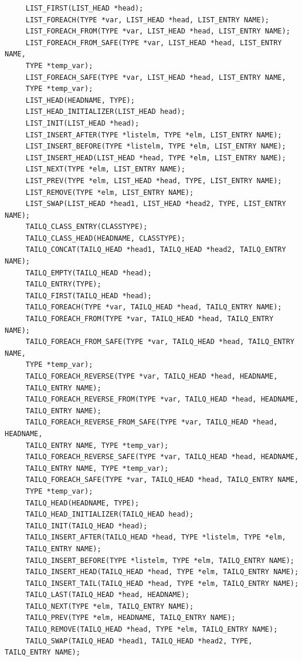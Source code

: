 \documentclass[journal,10pt,onecolumn,compsoc,letterpaper,draftclsnofoot,table,xcdraw]{IEEEtran} \usepackage[margin=0.75in]{geometry}
\begin{document}
\begin{verbatim}
     LIST_FIRST(LIST_HEAD *head);
     LIST_FOREACH(TYPE *var, LIST_HEAD *head, LIST_ENTRY NAME);
     LIST_FOREACH_FROM(TYPE *var, LIST_HEAD *head, LIST_ENTRY NAME);
     LIST_FOREACH_FROM_SAFE(TYPE *var, LIST_HEAD *head,	LIST_ENTRY NAME,
	 TYPE *temp_var);
     LIST_FOREACH_SAFE(TYPE *var, LIST_HEAD *head, LIST_ENTRY NAME,
	 TYPE *temp_var);
     LIST_HEAD(HEADNAME, TYPE);
     LIST_HEAD_INITIALIZER(LIST_HEAD head);
     LIST_INIT(LIST_HEAD *head);
     LIST_INSERT_AFTER(TYPE *listelm, TYPE *elm, LIST_ENTRY NAME);
     LIST_INSERT_BEFORE(TYPE *listelm, TYPE *elm, LIST_ENTRY NAME);
     LIST_INSERT_HEAD(LIST_HEAD	*head, TYPE *elm, LIST_ENTRY NAME);
     LIST_NEXT(TYPE *elm, LIST_ENTRY NAME);
     LIST_PREV(TYPE *elm, LIST_HEAD *head, TYPE, LIST_ENTRY NAME);
     LIST_REMOVE(TYPE *elm, LIST_ENTRY NAME);
     LIST_SWAP(LIST_HEAD *head1, LIST_HEAD *head2, TYPE, LIST_ENTRY NAME);
     TAILQ_CLASS_ENTRY(CLASSTYPE);
     TAILQ_CLASS_HEAD(HEADNAME,	CLASSTYPE);
     TAILQ_CONCAT(TAILQ_HEAD *head1, TAILQ_HEAD	*head2,	TAILQ_ENTRY NAME);
     TAILQ_EMPTY(TAILQ_HEAD *head);
     TAILQ_ENTRY(TYPE);
     TAILQ_FIRST(TAILQ_HEAD *head);
     TAILQ_FOREACH(TYPE	*var, TAILQ_HEAD *head,	TAILQ_ENTRY NAME);
     TAILQ_FOREACH_FROM(TYPE *var, TAILQ_HEAD *head, TAILQ_ENTRY NAME);
     TAILQ_FOREACH_FROM_SAFE(TYPE *var,	TAILQ_HEAD *head, TAILQ_ENTRY NAME,
	 TYPE *temp_var);
     TAILQ_FOREACH_REVERSE(TYPE	*var, TAILQ_HEAD *head,	HEADNAME,
	 TAILQ_ENTRY NAME);
     TAILQ_FOREACH_REVERSE_FROM(TYPE *var, TAILQ_HEAD *head, HEADNAME,
	 TAILQ_ENTRY NAME);
     TAILQ_FOREACH_REVERSE_FROM_SAFE(TYPE *var,	TAILQ_HEAD *head, HEADNAME,
	 TAILQ_ENTRY NAME, TYPE	*temp_var);
     TAILQ_FOREACH_REVERSE_SAFE(TYPE *var, TAILQ_HEAD *head, HEADNAME,
	 TAILQ_ENTRY NAME, TYPE	*temp_var);
     TAILQ_FOREACH_SAFE(TYPE *var, TAILQ_HEAD *head, TAILQ_ENTRY NAME,
	 TYPE *temp_var);
     TAILQ_HEAD(HEADNAME, TYPE);
     TAILQ_HEAD_INITIALIZER(TAILQ_HEAD head);
     TAILQ_INIT(TAILQ_HEAD *head);
     TAILQ_INSERT_AFTER(TAILQ_HEAD *head, TYPE *listelm, TYPE *elm,
	 TAILQ_ENTRY NAME);
     TAILQ_INSERT_BEFORE(TYPE *listelm,	TYPE *elm, TAILQ_ENTRY NAME);
     TAILQ_INSERT_HEAD(TAILQ_HEAD *head, TYPE *elm, TAILQ_ENTRY	NAME);
     TAILQ_INSERT_TAIL(TAILQ_HEAD *head, TYPE *elm, TAILQ_ENTRY	NAME);
     TAILQ_LAST(TAILQ_HEAD *head, HEADNAME);
     TAILQ_NEXT(TYPE *elm, TAILQ_ENTRY NAME);
     TAILQ_PREV(TYPE *elm, HEADNAME, TAILQ_ENTRY NAME);
     TAILQ_REMOVE(TAILQ_HEAD *head, TYPE *elm, TAILQ_ENTRY NAME);
     TAILQ_SWAP(TAILQ_HEAD *head1, TAILQ_HEAD *head2, TYPE, TAILQ_ENTRY	NAME);
\end{verbatim}
\end{document}
